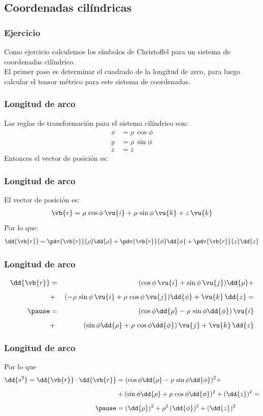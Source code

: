 \subsection{Coordenadas cilíndricas}
\begin{frame}
\frametitle{Ejercicio}
Como ejercicio calculemos los símbolos de Christoffel para un sistema de coordenadas cilíndrico.
\\
\bigskip
\pause
El primer paso es determinar el cuadrado de la longitud de arco, para luego calcular el tensor métrico para este sistema de coordenadas.
\end{frame}
\begin{frame}
\frametitle{Longitud de arco}
Las reglas de transformación para el sistema cilíndrico son:
\begin{align*}
x &= \rho \, \cos \phi \\[0.5em]
y &= \rho \, \sin \phi \\[0.5em]
z &= z
\end{align*}
Entonces el vector de posición es:
\end{frame}
\begin{frame}
\frametitle{Longitud de arco}
El vector de posición es:
\begin{align*}
\vb{r} = \rho \, \cos \phi \, \vu{i} + \rho \, \sin \phi \, \vu{k} + z \, \vu{k}
\end{align*}
\pause
Por lo que:
\begin{align*}
\dd{\vb{r}} = \pdv{\vb{r}}{\rho} \dd{\rho} + \pdv{\vb{r}}{\phi} \dd{\phi} + \pdv{\vb{r}}{z} \dd{z}
\end{align*}
\end{frame}
\begin{frame}
\frametitle{Longitud de arco}
\begin{eqnarray*}
\dd{\vb{r}} &=& (\cos \phi \, \vu{i} + \sin \phi \, \vu{j} ) \dd{\rho} + \\[0.5em]
&+& (- \rho \, \sin \phi \, \vu{i} + \rho \, \cos \phi \, \vu{j} ) \dd{\phi} + \vu{k} \, \dd{z} = \\[0.5em] \pause
&=& (\cos \phi \dd{\rho} - \rho \, \sin \phi \dd{\phi}) \, \vu{i} \\[0.5em]
&+& ( \sin \phi \dd{\rho} + \rho \, \cos \phi \dd{\phi} ) \, \vu{j} + \vu{k} \, \dd{z}
\end{eqnarray*}
\end{frame}
\begin{frame}
\frametitle{Longitud de arco}
Por lo que
\begin{align*}
\dd{s^{2}} = \dd{\vb{r}} \cdot \dd{\vb{r}} &= (\cos \phi \dd{\rho} - \rho \, \sin \phi \dd{\phi})^{2} +  \\[0.5em]
&+ ( \sin \phi \dd{\rho} + \rho \, \cos \phi \dd{\phi} )^{2} + (\dd{z})^{2} = \\[0.5em] \pause
&= (\dd{\rho})^{2} + \rho^{2} \, (\dd{\phi})^{2} + (\dd{z})^{2}
\end{align*}
\end{frame}
